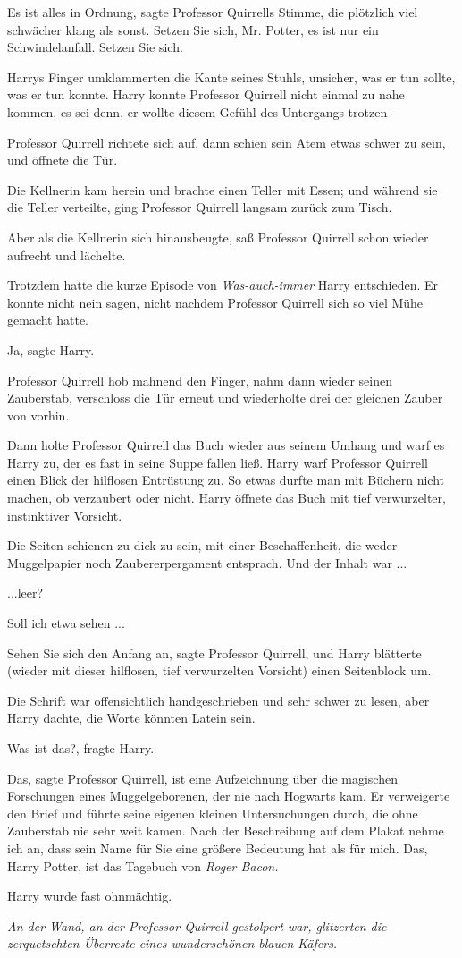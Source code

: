 \glqq{}Es ist alles in Ordnung\grqq{}, sagte Professor Quirrells Stimme, die
plötzlich viel schwächer klang als sonst. \glqq{}Setzen Sie sich, Mr. Potter, es
ist nur ein Schwindelanfall. Setzen Sie sich.\grqq{}

Harrys Finger umklammerten die Kante seines Stuhls, unsicher, was er tun sollte,
was er tun konnte. Harry konnte Professor Quirrell nicht einmal zu nahe kommen,
es sei denn, er wollte diesem Gefühl des Untergangs trotzen -

Professor Quirrell richtete sich auf, dann schien sein Atem etwas schwer zu
sein, und öffnete die Tür.

Die Kellnerin kam herein und brachte einen Teller mit Essen; und während sie die
Teller verteilte, ging Professor Quirrell langsam zurück zum Tisch.

Aber als die Kellnerin sich hinausbeugte, saß Professor Quirrell schon wieder
aufrecht und lächelte.

Trotzdem hatte die kurze Episode von \emph{\glqq{}Was-auch-immer\grqq{}} Harry
entschieden. Er konnte nicht nein sagen, nicht nachdem Professor Quirrell sich
so viel Mühe gemacht hatte.

\glqq{}Ja\grqq{}, sagte Harry.

Professor Quirrell hob mahnend den Finger, nahm dann wieder seinen Zauberstab,
verschloss die Tür erneut und wiederholte drei der gleichen Zauber von vorhin.

Dann holte Professor Quirrell das Buch wieder aus seinem Umhang und warf es
Harry zu, der es fast in seine Suppe fallen ließ. Harry warf Professor Quirrell
einen Blick der hilflosen Entrüstung zu. So etwas durfte man mit Büchern nicht
machen, ob verzaubert oder nicht. Harry öffnete das Buch mit tief verwurzelter,
instinktiver Vorsicht.

Die Seiten schienen zu dick zu sein, mit einer Beschaffenheit, die weder
Muggelpapier noch Zaubererpergament entsprach. Und der Inhalt war ...

...leer?

\glqq{} Soll ich etwa sehen ...\grqq{}

\glqq{}Sehen Sie sich den Anfang an\grqq{}, sagte Professor Quirrell, und Harry
blätterte (wieder mit dieser hilflosen, tief verwurzelten Vorsicht) einen
Seitenblock um.

Die Schrift war offensichtlich handgeschrieben und sehr schwer zu lesen, aber
Harry dachte, die Worte könnten Latein sein.

\glqq{}Was ist das?\grqq{}, fragte Harry.

\glqq{}Das\grqq{}, sagte Professor Quirrell, \glqq{}ist eine Aufzeichnung über
die magischen Forschungen eines Muggelgeborenen, der nie nach Hogwarts kam. Er
verweigerte den Brief und führte seine eigenen kleinen Untersuchungen durch, die
ohne Zauberstab nie sehr weit kamen. Nach der Beschreibung auf dem Plakat nehme
ich an, dass sein Name für Sie eine größere Bedeutung hat als für mich. Das,
Harry Potter, ist das Tagebuch von \emph{Roger Bacon.}\grqq{}

Harry wurde fast ohnmächtig.

\emph{An der Wand, an der Professor Quirrell gestolpert war, glitzerten die
zerquetschten Überreste eines wunderschönen blauen Käfers.}
